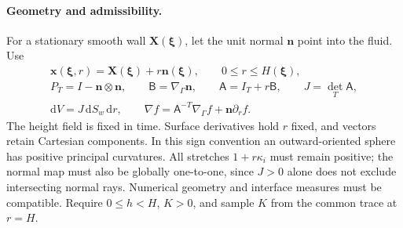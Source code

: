 \documentclass[11pt,a4paper]{article}
\numberwithin{equation}{section}
\begin{document}
\paragraph{Geometry and admissibility.}
For a stationary smooth wall $\boldsymbol X(\boldsymbol\xi)$, let the unit
normal $\boldsymbol n$ point into the fluid. Use
\begin{equation}
 \begin{gathered}
 \boldsymbol x(\boldsymbol\xi,r)
 =\boldsymbol X(\boldsymbol\xi)+r\boldsymbol n(\boldsymbol\xi),\qquad
 0\leq r\leq H(\boldsymbol\xi),\\
 P_T=I-\boldsymbol n\otimes\boldsymbol n,\qquad
 \mathsf B=\nabla_\Gamma\boldsymbol n,\qquad
 \mathsf A=I_T+r\mathsf B,\qquad J=\det_T\mathsf A,\\
 \mathrm dV=J\,\mathrm dS_w\,\mathrm dr,\qquad
 \nabla f=\mathsf A^{-T}\nabla_\Gamma f+\boldsymbol n\partial_rf.
 \end{gathered}
 \label{ba:curved-map}
\end{equation}
The height field is fixed in time. Surface derivatives hold $r$ fixed,
and vectors retain Cartesian components. In this sign convention an
outward-oriented sphere has positive principal curvatures. All stretches
$1+r\kappa_i$ must remain positive; the normal map must also be globally
one-to-one, since $J>0$ alone does not exclude intersecting normal rays.
Numerical geometry and interface measures must be compatible. Require
$0\leq h<H$, $K>0$, and sample $K$ from the common trace at $r=H$.
\end{document}
